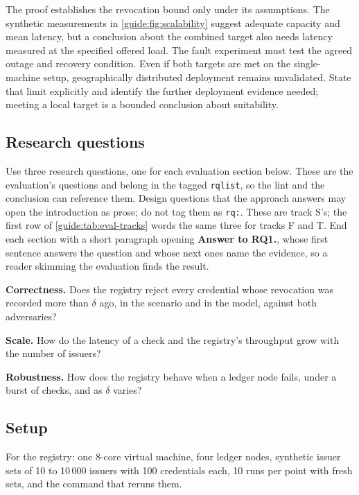 The proof establishes the revocation bound only under its assumptions. The synthetic measurements in \cref{guide:fig:scalability} suggest adequate capacity and mean latency, but a conclusion about the combined target also needs latency measured at the specified offered load. The fault experiment must test the agreed outage and recovery condition. Even if both targets are met on the single-machine setup, geographically distributed deployment remains unvalidated. State that limit explicitly and identify the further deployment evidence needed; meeting a local target is a bounded conclusion about suitability.

\subsection[Research questions]{Research questions\skimmark}\label{guide:chapters:research-questions}
Use three research questions, one for each evaluation section below. These are the evaluation's questions and belong in the tagged \texttt{rqlist}, so the lint and the conclusion can reference them. Design questions that the approach answers may open the introduction as prose; do not tag them as \texttt{rq:}. These are track S's; the first row of \cref{guide:tab:eval-tracks} words the same three for tracks F and T. End each section with a short paragraph opening \textbf{Answer to RQ1.}, whose first sentence answers the question and whose next ones name the evidence, so a reader skimming the evaluation finds the result.
\begin{rqlist}
  \item\label{guide:rq:correct} \textbf{Correctness.} Does the registry reject every credential whose revocation was recorded more than $\delta$ ago, in the scenario and in the model, against both adversaries?
  \item\label{guide:rq:scale} \textbf{Scale.} How do the latency of a check and the registry's throughput grow with the number of issuers?
  \item\label{guide:rq:robust} \textbf{Robustness.} How does the registry behave when a ledger node fails, under a burst of checks, and as $\delta$ varies?
\end{rqlist}

\subsection{Setup}\label{guide:chapters:setup}
For the registry: one 8-core virtual machine, four ledger nodes, synthetic issuer sets of 10 to 10\,000 issuers with 100 credentials each, 10 runs per point with fresh sets, and the command that reruns them.

